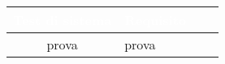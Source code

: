 {
\renewcommand{\arraystretch}{1.5}
\centering
\begin{longtable}{ c C{4cm} c c}
\textcolor{white}{\textbf{Test di sistema}} & \textcolor{white}{\textbf{Requisito}}\\	
\endhead
prova & prova
\end{longtable}
}























